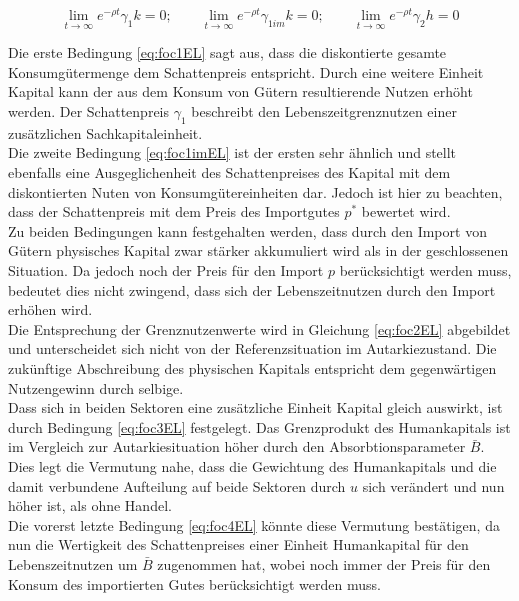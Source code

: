 \vspace{-0.6cm}
\begin{equation}
\lim_{t \to \infty}e^{-\rho t}\gamma_1k=0;\qquad \lim_{t \to \infty}e^{-\rho t}\gamma_{1im}k=0; \qquad \lim_{t \to \infty}e^{-\rho t}\gamma_2h=0
\end{equation}

Die erste Bedingung \eqref{eq:foc1EL} sagt aus, dass die diskontierte gesamte Konsumgütermenge dem Schattenpreis entspricht. Durch eine weitere Einheit Kapital kann der aus dem Konsum von Gütern resultierende Nutzen erhöht werden. Der Schattenpreis $\gamma_1$ beschreibt den Lebenszeitgrenznutzen einer zusätzlichen Sachkapitaleinheit.\\
Die zweite Bedingung \eqref{eq:foc1imEL} ist der ersten sehr ähnlich und stellt ebenfalls eine Ausgeglichenheit des Schattenpreises des Kapital mit dem diskontierten Nuten von Konsumgütereinheiten dar. Jedoch ist hier zu beachten, dass der Schattenpreis mit dem Preis des Importgutes $p^*$ bewertet wird.\\
Zu beiden Bedingungen kann festgehalten werden, dass durch den Import von Gütern physisches Kapital zwar stärker akkumuliert wird als in der geschlossenen Situation. Da jedoch noch der Preis für den Import $p$ berücksichtigt werden muss, bedeutet dies nicht zwingend, dass sich der Lebenszeitnutzen durch den Import erhöhen wird.\\
Die Entsprechung der Grenznutzenwerte wird in Gleichung \eqref{eq:foc2EL} abgebildet und unterscheidet sich nicht von der Referenzsituation im Autarkiezustand. Die zukünftige Abschreibung des physischen Kapitals entspricht dem gegenwärtigen Nutzengewinn durch selbige. \\ 
Dass sich in beiden Sektoren eine zusätzliche Einheit Kapital gleich auswirkt, ist durch Bedingung \eqref{eq:foc3EL} festgelegt. Das Grenzprodukt des Humankapitals ist im Vergleich zur Autarkiesituation höher durch den Absorbtionsparameter $\bar{B}$. Dies legt die Vermutung nahe, dass die Gewichtung des Humankapitals und die damit verbundene Aufteilung auf beide Sektoren durch $u$ sich verändert und nun höher ist, als ohne Handel.\\
Die vorerst letzte Bedingung \eqref{eq:foc4EL} könnte diese Vermutung bestätigen, da nun die Wertigkeit des Schattenpreises einer Einheit Humankapital für den Lebenszeitnutzen um $\bar{B}$ zugenommen hat, wobei noch immer der Preis für den Konsum des importierten Gutes berücksichtigt werden muss.

